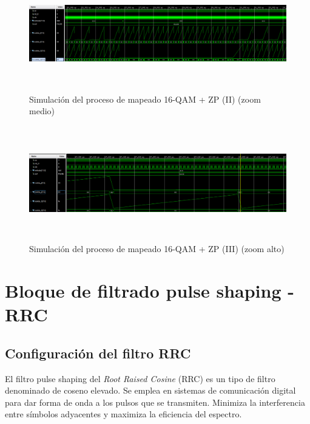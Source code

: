 \vspace{3mm}

\begin{figure}[h]
	\centering
	\includegraphics[width=1\textwidth,height=5cm]{img/simu/process_qam_3.PNG}
	\caption{Simulación del proceso de mapeado 16-QAM + ZP (II) (zoom medio)}
	\label{fig:proc3}
\end{figure}

\vspace{3mm}

\begin{figure}[!h]
	\centering
	\includegraphics[width=1\textwidth,height=5cm]{img/simu/process_qam.PNG}
	\caption{Simulación del proceso de mapeado 16-QAM + ZP (III) (zoom alto)}
	\label{fig:proc1}
\end{figure}

\clearpage

\section{Bloque de filtrado pulse shaping - RRC}

\subsection{Configuración del filtro RRC}

El filtro pulse shaping del \textit{Root Raised Cosine} (RRC) es un tipo de filtro denominado de coseno elevado. Se emplea en sistemas de comunicación digital para dar forma de onda a los pulsos que se transmiten. Minimiza la interferencia entre símbolos adyacentes y maximiza la eficiencia del espectro.

